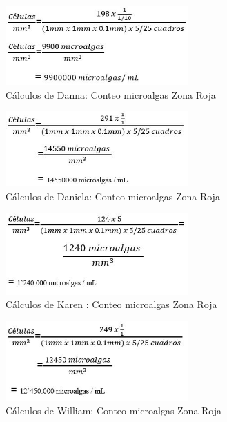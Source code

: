 \documentclass[journal,transmag]{IEEEtran}
\begin{document}
    \begin{figure}[!h] 
	\center 
	\includegraphics[width=7cm]{I19.jpg} 
	\caption{Cálculos de Danna: Conteo microalgas Zona Roja } 
	\label{I1}
	\end{figure} 
	\begin{figure}[!h] 
	\center 
	\includegraphics[width=7cm]{I21.jpg} 
	\caption{Cálculos de Daniela: Conteo microalgas Zona Roja} 
	\label{I1}
	\end{figure} 
	\begin{figure}[!h] 
	\center 
	\includegraphics[width=7cm]{I23.jpg} 
	\caption{Cálculos de Karen : Conteo microalgas Zona Roja } 
	\label{I1}
	\end{figure} 
	\begin{figure}[!h] 
	\center 
	\includegraphics[width=7cm]{I25.jpg} 
	\caption{Cálculos de William: Conteo microalgas Zona Roja } 
	\label{I1}
	\end{figure} 
\end{document}
